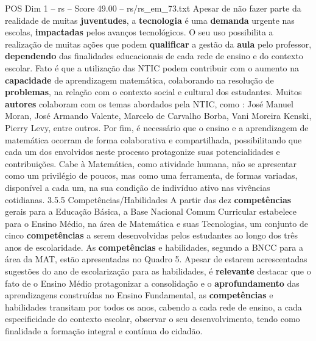 \begin{textsample}{POS Dim 1 – rs – Score 49.00 – rs/rs\_em\_73.txt}
Apesar de não fazer parte da realidade de muitas \textbf{juventudes}, a \textbf{tecnologia} é uma \textbf{demanda} urgente nas escolas, \textbf{impactadas} pelos avanços tecnológicos.
O seu uso possibilita a realização de muitas ações que podem \textbf{qualificar} a gestão da \textbf{aula} pelo professor, \textbf{dependendo} das finalidades educacionais de cada rede de ensino e do contexto escolar.
Fato é que a utilização das NTIC podem contribuir com o aumento na \textbf{capacidade} de aprendizagem matemática, colaborando na resolução de \textbf{problemas}, na relação com o contexto social e cultural dos estudantes.
Muitos \textbf{autores} colaboram com os temas abordados pela NTIC, como : José Manuel Moran, José Armando Valente, Marcelo de Carvalho Borba, Vani Moreira Kenski, Pierry Levy, entre outros.
Por fim, é necessário que o ensino e a aprendizagem de matemática ocorram de forma colaborativa e compartilhada, possibilitando que cada um dos envolvidos neste processo protagonize suas potencialidades e contribuições.
Cabe à Matemática, como atividade humana, não se apresentar como um privilégio de poucos, mas como uma ferramenta, de formas variadas, disponível a cada um, na sua condição de indivíduo ativo nas vivências cotidianas. 3.5.5 Competências/Habilidades A partir das dez \textbf{competências} gerais para a Educação Básica, a Base Nacional Comum Curricular estabelece para o Ensino Médio, na área de Matemática e suas Tecnologias, um conjunto de cinco \textbf{competências} a serem desenvolvidas pelos estudantes ao longo dos três anos de escolaridade.
As \textbf{competências} e habilidades, segundo a BNCC para a área da MAT, estão apresentadas no Quadro 5.
Apesar de estarem acrescentadas sugestões do ano de escolarização para as habilidades, é \textbf{relevante} destacar que o fato de o Ensino Médio protagonizar a consolidação e o \textbf{aprofundamento} das aprendizagens construídas no Ensino Fundamental, as \textbf{competências} e habilidades transitam por todos os anos, cabendo a cada rede de ensino, a cada especificidade do contexto escolar, observar o seu desenvolvimento, tendo como finalidade a formação integral e contínua do cidadão.

\end{textsample}
